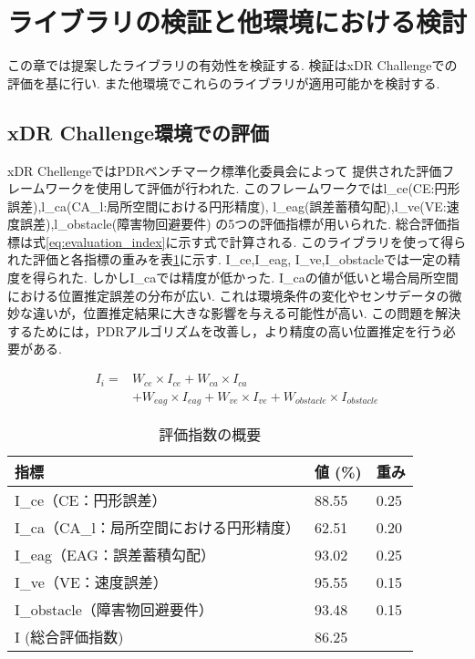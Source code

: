 
\section{ライブラリの検証と他環境における検討}
この章では提案したライブラリの有効性を検証する.
検証はxDR Challengeでの評価を基に行い.
また他環境でこれらのライブラリが適用可能かを検討する.

\subsection{xDR Challenge環境での評価}
xDR ChellengeではPDRベンチマーク標準化委員会によって
提供された評価フレームワークを使用して評価が行われた.
このフレームワークではl\_ce(CE:円形誤差),l\_ca(CA\_l:局所空間における円形精度),
l\_eag(誤差蓄積勾配),l\_ve(VE:速度誤差),l\_obstacle(障害物回避要件)
の5つの評価指標が用いられた.
総合評価指標は式\ref{eq:evaluation_index}に示す式で計算される.
このライブラリを使って得られた評価と各指標の重みを表\ref{table:evaluation_index}に示す.
I\_ce,I\_eag, I\_ve,I\_obstacleでは一定の精度を得られた.
しかしI\_caでは精度が低かった.
I\_caの値が低いと場合局所空間における位置推定誤差の分布が広い.
これは環境条件の変化やセンサデータの微妙な違いが，位置推定結果に大きな影響を与える可能性が高い.
この問題を解決するためには，PDRアルゴリズムを改善し，より精度の高い位置推定を行う必要がある.

\begin{equation}
	\begin{aligned}
		I_i = & W_{ce} \times I_{ce} + W_{ca} \times I_{ca}                                        \\
		      & + W_{eag} \times I_{eag} + W_{ve} \times I_{ve} + W_{obstacle} \times I_{obstacle}
	\end{aligned}
	\label{eq:evaluation_index}
\end{equation}

\begin{table}[ht]
	\centering
	\begin{tabular}{l|l|l}
		\hline
		指標                        & 値 (\%) & 重み   \\ \hline
		I\_ce（CE：円形誤差）            & 88.55  & 0.25 \\
		I\_ca（CA\_l：局所空間における円形精度） & 62.51  & 0.20 \\
		I\_eag（EAG：誤差蓄積勾配）        & 93.02  & 0.25 \\
		I\_ve（VE：速度誤差）            & 95.55  & 0.15 \\
		I\_obstacle（障害物回避要件）      & 93.48  & 0.15 \\
		I (総合評価指数)                & 86.25  &      \\ \hline
	\end{tabular}
	\caption{評価指数の概要}
	\label{table:evaluation_index}
\end{table}

